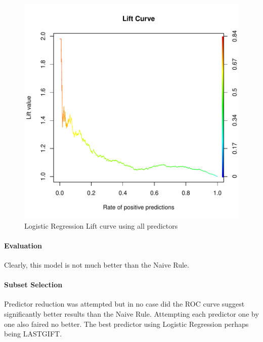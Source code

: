 \documentclass{article}
\begin{document}
\begin{figure}
\begin{center}
\begin{Schunk}
\end{Schunk}
\includegraphics{DirectMailPrediction-007}
\end{center}
\caption{Logistic Regression Lift curve using all predictors}
\label{lr-lift-a}
\end{figure}

\paragraph{Evaluation}
Clearly, this model is not much better than the Naive Rule. 

\paragraph{Subset Selection}
Predictor reduction was attempted but in no case did the ROC curve suggest significantly better results than the Naive Rule. Attempting each predictor one by one also faired no better. The best predictor using Logistic Regression perhaps being LASTGIFT. 
\end{document}
